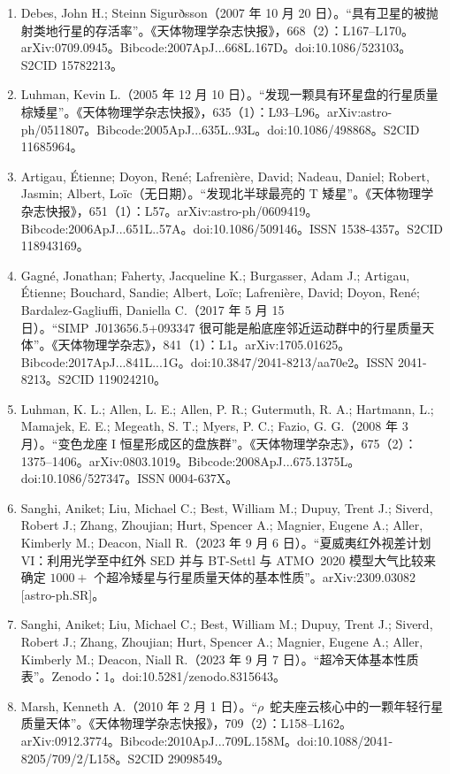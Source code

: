 \begin{enumerate}
\item Debes, John H.; Steinn Sigurðsson（2007 年 10 月 20 日）。“具有卫星的被抛射类地行星的存活率”。《天体物理学杂志快报》，668（2）：L167--L170。arXiv:0709.0945。Bibcode:2007ApJ...668L.167D。doi:10.1086/523103。S2CID 15782213。  
\item Luhman, Kevin L.（2005 年 12 月 10 日）。“发现一颗具有环星盘的行星质量棕矮星”。《天体物理学杂志快报》，635（1）：L93--L96。arXiv:astro-ph/0511807。Bibcode:2005ApJ...635L..93L。doi:10.1086/498868。S2CID 11685964。  
\item Artigau, Étienne; Doyon, René; Lafrenière, David; Nadeau, Daniel; Robert, Jasmin; Albert, Loïc（无日期）。“发现北半球最亮的 T 矮星”。《天体物理学杂志快报》，651（1）：L57。arXiv:astro-ph/0609419。Bibcode:2006ApJ...651L..57A。doi:10.1086/509146。ISSN 1538-4357。S2CID 118943169。  
\item Gagné, Jonathan; Faherty, Jacqueline K.; Burgasser, Adam J.; Artigau, Étienne; Bouchard, Sandie; Albert, Loïc; Lafrenière, David; Doyon, René; Bardalez-Gagliuffi, Daniella C.（2017 年 5 月 15 日）。“SIMP~J013656.5+093347 很可能是船底座邻近运动群中的行星质量天体”。《天体物理学杂志》，841（1）：L1。arXiv:1705.01625。Bibcode:2017ApJ...841L...1G。doi:10.3847/2041-8213/aa70e2。ISSN 2041-8213。S2CID 119024210。  
\item Luhman, K. L.; Allen, L. E.; Allen, P. R.; Gutermuth, R. A.; Hartmann, L.; Mamajek, E. E.; Megeath, S. T.; Myers, P. C.; Fazio, G. G.（2008 年 3 月）。“变色龙座 I 恒星形成区的盘族群”。《天体物理学杂志》，675（2）：1375--1406。arXiv:0803.1019。Bibcode:2008ApJ...675.1375L。doi:10.1086/527347。ISSN 0004-637X。  
\item Sanghi, Aniket; Liu, Michael C.; Best, William M.; Dupuy, Trent J.; Siverd, Robert J.; Zhang, Zhoujian; Hurt, Spencer A.; Magnier, Eugene A.; Aller, Kimberly M.; Deacon, Niall R.（2023 年 9 月 6 日）。“夏威夷红外视差计划 VI：利用光学至中红外 SED 并与 BT-Settl 与 ATMO~2020 模型大气比较来确定 $1000+$ 个超冷矮星与行星质量天体的基本性质”。arXiv:2309.03082 [astro-ph.SR]。  
\item Sanghi, Aniket; Liu, Michael C.; Best, William M.; Dupuy, Trent J.; Siverd, Robert J.; Zhang, Zhoujian; Hurt, Spencer A.; Magnier, Eugene A.; Aller, Kimberly M.; Deacon, Niall R.（2023 年 9 月 7 日）。“超冷天体基本性质表”。Zenodo：1。doi:10.5281/zenodo.8315643。  
\item Marsh, Kenneth A.（2010 年 2 月 1 日）。“$\rho$~蛇夫座云核心中的一颗年轻行星质量天体”。《天体物理学杂志快报》，709（2）：L158--L162。arXiv:0912.3774。Bibcode:2010ApJ...709L.158M。doi:10.1088/2041-8205/709/2/L158。S2CID 29098549。  

\end{enumerate}
